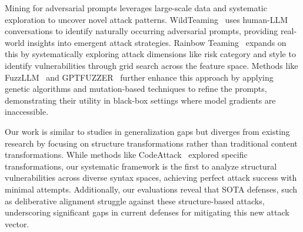  Mining for adversarial prompts leverages large-scale data and systematic exploration to uncover novel attack patterns. WildTeaming~\cite{jiang2024wildteaming} uses human-LLM conversations to identify naturally occurring adversarial prompts, providing real-world insights into emergent attack strategies. Rainbow Teaming~\cite{samvelyan2024rainbow} expands on this by systematically exploring attack dimensions like risk category and style to identify vulnerabilities through grid search across the feature space. Methods like FuzzLLM~\cite{yao2024fuzzllm} and GPTFUZZER~\cite{yu2023gptfuzzer} further enhance this approach by applying genetic algorithms and mutation-based techniques to refine the prompts, demonstrating their utility in black-box settings where model gradients are inaccessible.

Our work is similar to studies in generalization gaps but diverges from existing research by focusing on structure transformations rather than traditional content transformations. While methods like CodeAttack~\cite{ren2024codeattack} explored specific transformations, our systematic framework is the first to analyze structural vulnerabilities across diverse syntax spaces, achieving perfect attack success with minimal attempts. Additionally, our evaluations reveal that SOTA defenses, such as deliberative alignment struggle against these structure-based attacks, underscoring significant gaps in current defenses for mitigating this new attack vector.